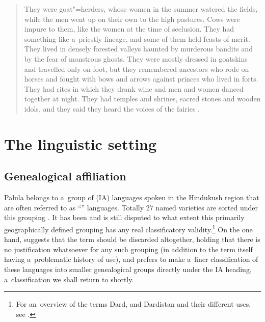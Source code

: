 \begin{quote}
They were goat"=herders, whose women in the summer watered the fields, while the men went up on their
own to the high pastures. Cows were impure to them, like the women at the time of seclusion. They
had something like a~priestly lineage, and some of them held feasts of merit. They lived in densely
forested valleys haunted by murderous bandits and by the fear of monstrous ghosts. They were mostly
dressed in goatskins and travelled only on foot, but they remembered ancestors who rode on horses
and fought with bows and arrows against princes who lived in forts. They had rites in which they
drank wine and men and women danced together at night. They had temples and shrines, sacred stones
and wooden idols, and they said they heard the voices of the fairies \citep[143]{cacopardo2001}.
\end{quote}

\section{The linguistic setting}
\label{sec:1-3}
\subsection{Genealogical affiliation}
\label{subsec:1-3-1}
Palula belongs to a~group of \iliIndoAryan (IA) languages spoken in the Hindukush region that are often referred to as ``\iliDardic'' languages. Totally 27 named varieties are sorted under this grouping \citep{ethnologue2015}. It has been and is still disputed to what extent this primarily geographically defined grouping has any real classificatory validity.\footnote{For an~overview of the terms Dard, \iliDardic and Dardistan and their different uses, see \citealt{mock1997}.} On the one hand, \citet[251]{strand2001} suggests that the term should be discarded altogether, holding that there is no justification whatsoever for any such grouping (in addition to the term itself having a~problematic history of use), and prefers to make a~finer classification of these languages into smaller genealogical groups directly under the IA heading, a~classification we shall return to shortly. 

